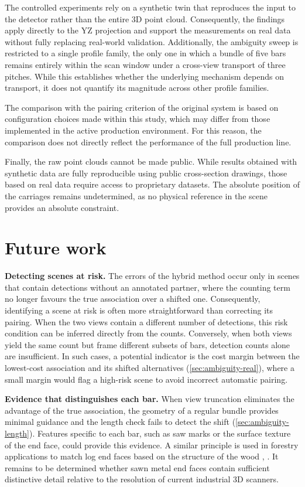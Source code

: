 \documentclass[a4paper, 12pt, twoside]{book}
\newcommand{\citev}[1]{\citeauthor{#1} \citeyear{#1} \cite{#1}}
\begin{document}
The controlled experiments rely on a synthetic twin that reproduces the input to the detector rather than the entire 3D point cloud. Consequently, the findings apply directly to the YZ projection and support the measurements on real data without fully replacing real-world validation. Additionally, the ambiguity sweep is restricted to a single profile family, the only one in which a bundle of five bars remains entirely within the scan window under a cross-view transport of three pitches. While this establishes whether the underlying mechanism depends on transport, it does not quantify its magnitude across other profile families.

The comparison with the pairing criterion of the original system is based on configuration choices made within this study, which may differ from those implemented in the active production environment. For this reason, the comparison does not directly reflect the performance of the full production line.

Finally, the raw point clouds cannot be made public. While results obtained with synthetic data are fully reproducible using public cross-section drawings, those based on real data require access to proprietary datasets. The absolute position of the carriages remains undetermined, as no physical reference in the scene provides an absolute constraint.

\section{Future work}
\label{sec:concl-future}

\textbf{Detecting scenes at risk.} The errors of the hybrid method occur only in scenes that contain detections without an annotated partner, where the counting term no longer favours the true association over a shifted one. Consequently, identifying a scene at risk is often more straightforward than correcting its pairing. When the two views contain a different number of detections, this risk condition can be inferred directly from the counts. Conversely, when both views yield the same count but frame different subsets of bars, detection counts alone are insufficient. In such cases, a potential indicator is the cost margin between the lowest-cost association and its shifted alternatives (\cref{sec:ambiguity-real}), where a small margin would flag a high-risk scene to avoid incorrect automatic pairing.

\textbf{Evidence that distinguishes each bar.} When view truncation eliminates the advantage of the true association, the geometry of a regular bundle provides minimal guidance and the length check fails to detect the shift (\cref{sec:ambiguity-length}). Features specific to each bar, such as saw marks or the surface texture of the end face, could provide this evidence. A similar principle is used in forestry applications to match log end faces based on the structure of the wood \citev{schraml2015}, \citev{xie2025}. It remains to be determined whether sawn metal end faces contain sufficient distinctive detail relative to the resolution of current industrial 3D scanners.
\end{document}
